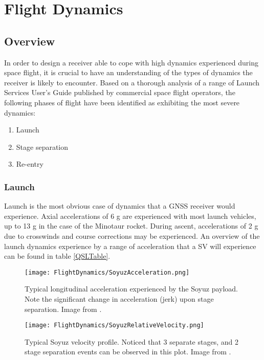 \label{ch:FlightDynamics}
\chapter{Flight Dynamics}

\section{Overview}
In order to design a receiver able to cope with high dynamics experienced during space flight, it is crucial to have an understanding of the types of dynamics the receiver is likely to encounter. Based on a thorough analysis of a range of Launch Services User's Guide published by commercial space flight operators, the following phases of flight have been identified as exhibiting the most severe dynamics: 

\begin{enumerate}
\item{Launch}
\item{Stage separation}
\item{Re-entry}
\end{enumerate}

\subsection{Launch}
Launch is the most obvious case of dynamics that a \ac{GNSS} receiver would experience. Axial accelerations of 6 g are experienced with most launch vehicles, up to 13 g in the case of the Minotaur rocket. During ascent, accelerations of 2 g due to crosswinds and course corrections may be experienced. An overview of the launch dynamics experience by a range of acceleration that a \ac{SV} will experience can be found in table \ref{QSLTable}.

\begin{figure}[!htb] 
    \centering
    \texttt{[image: FlightDynamics/SoyuzAcceleration.png]} 
    \caption{Typical longitudinal acceleration experienced by the Soyuz payload. Note the significant change in acceleration (jerk) upon stage separation. Image from \cite{Soyuz}.}
    \label{fig:SoyuzAcceleration}
\end{figure}

\begin{figure}[!htb] 
    \centering
    \texttt{[image: FlightDynamics/SoyuzRelativeVelocity.png]} 
    \caption{Typical Soyuz velocity profile. Noticed that 3 separate stages, and 2 stage separation events can be observed in this plot. Image from \cite{Soyuz}.}
    \label{fig:SoyuzRelativeVelocity}
\end{figure}


